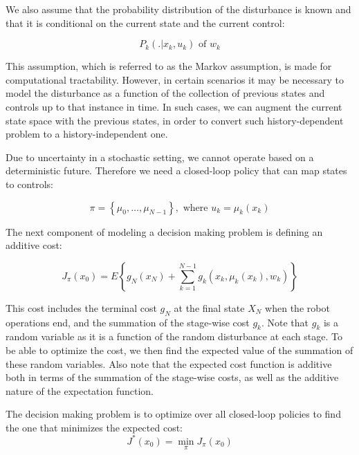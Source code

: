 \documentclass[twoside]{article}
\begin{document}
We also assume that the probability distribution of the disturbance is known and that it is conditional on the current state and the current control: 

\begin{equation*}
    P_{k}(.|x_{k}, u_{k}) \text { of } w_{k}
\end{equation*}

This assumption, which is referred to as the Markov assumption, is made for computational tractability. However, in certain scenarios it may be necessary to model the disturbance as a function of the collection of previous states and controls up to that instance in time. In such cases, we can augment the current state space with the previous states, in order to convert such history-dependent problem to a history-independent one.

Due to uncertainty in a stochastic setting, we cannot operate based on a deterministic future. Therefore we need a closed-loop policy that can map states to controls:

\begin{equation*}
    \pi=\left\{\mu_{0}, \ldots, \mu_{N-1}\right\}, \text { where } u_{k}=\mu_{k}\left(x_{k}\right)
\end{equation*} 

The next component of modeling a decision making problem is defining an additive cost: 

\begin{equation*}
    J_{\pi}\left(x_{0}\right)=E\left\{g_{N}\left(x_{N}\right)+\sum_{k=1}^{N-1} g_{k}\left(x_{k}, \mu_{k}\left(x_{k}\right), w_{k}\right)\right\}
\end{equation*}

This cost includes the terminal cost $g_{N}$ at the final state $X_{N}$ when the robot operations end, and the summation of the stage-wise cost $g_{k}$. Note that $g_{k}$ is a random variable as it is a function of the random disturbance at each stage. To be able to optimize the cost, we then find the expected value of the summation of these random variables. Also note that the expected cost function is additive both in terms of the summation of the stage-wise costs, as well as the additive nature of the expectation function.  

The decision making problem is to optimize over all closed-loop policies to find the one that minimizes the expected cost:  
\begin{equation*}
    J^{*}\left(x_{0}\right)=\min_{\pi} J_{\pi}\left(x_{0}\right)
\end{equation*}
\end{document}
